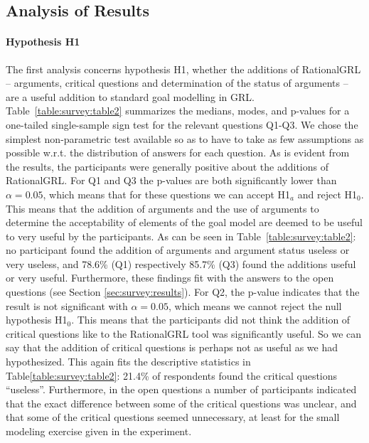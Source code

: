 \subsection{Analysis of Results}\label{sect:validation:analysis}

\paragraph{Hypothesis H1}
The first analysis concerns hypothesis H1, whether the additions of RationalGRL -- arguments, critical questions and determination of the status of arguments -- are a useful addition to standard goal modelling in GRL. Table~\ref{table:survey:table2} summarizes the medians, modes, and p-values for a one-tailed single-sample sign test for the relevant questions Q1-Q3. We chose the simplest non-parametric test available so as to have to take as few assumptions as possible w.r.t. the distribution of answers for each question. As is evident from the results, the participants were generally positive about the additions of RationalGRL. For Q1 and Q3 the p-values are both significantly lower than $\alpha = 0.05$, which means that for these questions we can accept H1$_{a}$ and reject H1$_{0}$. This means that the addition of arguments and the use of arguments to determine the acceptability of elements of the goal model are deemed to be useful to very useful by the participants. As can be seen in Table~\ref{table:survey:table2}: no participant found the addition of arguments and argument status useless or very useless, and 78.6\% (Q1) respectively 85.7\% (Q3) found the additions useful or very useful. Furthermore, these findings fit with the answers to the open questions (see Section \ref{sec:survey:results}). For Q2, the p-value indicates that the result is not significant with $\alpha = 0.05$, which means we cannot reject the null hypothesis H1$_{0}$. This means that the participants did not think the addition of critical questions like to the RationalGRL tool was significantly useful. So we can say that the addition of critical questions is perhaps not as useful as we had hypothesized. This again fits the descriptive statistics in Table\ref{table:survey:table2}: 21.4\% of respondents found the critical questions ``useless''. Furthermore, in the open questions a number of participants indicated that the exact difference between some of the critical questions was unclear, and that some of the critical questions seemed unnecessary, at least for the small modeling exercise given in the experiment.

